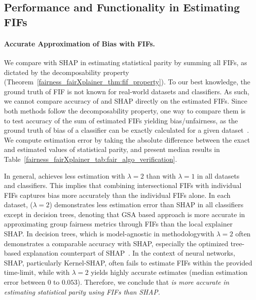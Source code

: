 

\subsection{Performance and Functionality in Estimating FIFs}
\paragraph{Accurate Approximation of Bias with FIFs.} We compare {\fairXplainer} with SHAP in estimating statistical parity by summing all FIFs, as dictated by the decomposability property (Theorem~\ref{fairness_fairXplainer_thm:fif_property}). {To our best knowledge, the ground truth of FIF is not known for real-world datasets and classifiers. As such, we cannot compare accuracy of {\fairXplainer} and SHAP directly on the estimated FIFs. Since both methods follow the decomposability property, one way to compare them is to test accuracy of the sum of estimated FIFs yielding bias/unfairness, as the ground truth of bias of a classifier can be exactly calculated for a given dataset~\cite{aif360-oct-2018}.}
We compute estimation error by taking the absolute difference between the exact and  estimated values of statistical parity, and present median results in Table~\ref{fairness_fairXplainer_tab:fair_algo_verification}. 

In general, {\fairXplainer} achieves less estimation with $ \lambda = 2 $ than with $ \lambda = 1 $ in all datasets and classifiers. This implies that combining intersectional FIFs with individual FIFs captures bias more accurately than the individual FIFs alone. In each dataset, {\fairXplainer} ($\lambda = 2$) demonstrates less estimation error than SHAP in all classifiers except in decision trees, denoting that GSA based approach {\fairXplainer} is more accurate in approximating group fairness metrics through FIFs than the local explainer SHAP. In decision trees, {\fairXplainer}\textemdash which is model-agnostic in methodology\textemdash with $ \lambda = 2 $ often demonstrates a comparable accuracy with SHAP, especially the optimized tree-based explanation counterpart of SHAP~\cite{lundberg2020local2global}. In the context of neural networks, SHAP, particularly Kernel-SHAP, often fails to estimate FIFs within the provided time-limit, while {\fairXplainer} with $ \lambda = 2 $ yields highly accurate estimates (median estimation error between $ 0$ to $0.053 $). Therefore, we conclude that \emph{{\fairXplainer} is more accurate in estimating statistical parity using FIFs than SHAP.}

